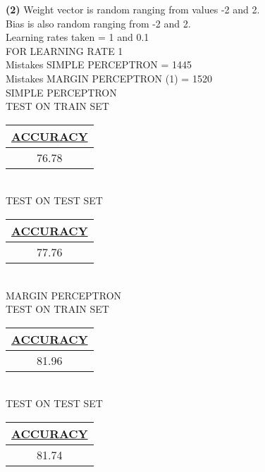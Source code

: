 \documentclass[11pt]{article}
\renewcommand\part[1]{\vspace{.10in}\textbf{(#1)}}
\begin{document}
\part{2} Weight vector is random ranging from values -2 and 2.\\ Bias is also random ranging from -2 and 2. 
\\Learning rates taken = 1 and 0.1
\\FOR LEARNING RATE 1
\\Mistakes SIMPLE PERCEPTRON = 1445
\\Mistakes MARGIN PERCEPTRON (1) = 1520
\\SIMPLE PERCEPTRON
\\TEST ON TRAIN SET 
\bgroup 
\def\arraystretch{1.2}
\begin{tabular}{|c|} \hline 
{\bf \underline {ACCURACY}} \\ \hline
76.78 \\ \hline
\end{tabular}
\egroup
\\TEST ON TEST SET
\bgroup 
\def\arraystretch{1.2}
\begin{tabular}{|c|} \hline 
{\bf \underline {ACCURACY}} \\ \hline
77.76  \\ \hline
\end{tabular}
\egroup
\\[15pt]MARGIN PERCEPTRON
\\TEST ON TRAIN SET 
\bgroup 
\def\arraystretch{1.2}
\begin{tabular}{|c|} \hline 
{\bf \underline {ACCURACY}} \\ \hline
81.96  \\ \hline
\end{tabular}
\egroup
\\TEST ON TEST SET
\bgroup 
\def\arraystretch{1.2}
\begin{tabular}{|c|} \hline 
{\bf \underline {ACCURACY}} \\ \hline
81.74 \\ \hline
\end{tabular}
\egroup
\end{document}
